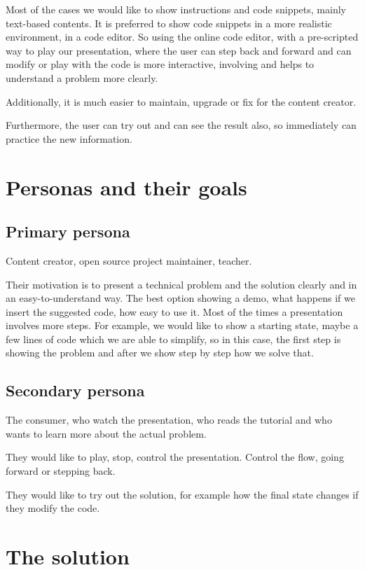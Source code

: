 \documentclass[11pt, a4paper, twoside, openright]{report}
\begin{document}
Most of the cases we would like to show instructions and code snippets, mainly text-based contents. It is preferred to show code snippets in a more realistic environment, in a code editor. So using the online code editor, with a pre-scripted way to play our presentation, where the user can step back and forward and can modify or play with the code is more interactive, involving and helps to understand a problem more clearly.

Additionally, it is much easier to maintain, upgrade or fix for the content creator.

Furthermore, the user can try out and can see the result also, so immediately can practice the new information.

\section{Personas and their goals}

\subsection{Primary persona}

Content creator, open source project maintainer, teacher.

Their motivation is to present a technical problem and the solution clearly and in an easy-to-understand way. The best option showing a demo, what happens if we insert the suggested code, how easy to use it. Most of the times a presentation involves more steps. For example, we would like to show a starting state, maybe a few lines of code which we are able to simplify, so in this case, the first step is showing the problem and after we show step by step how we solve that.

\subsection{Secondary persona}

The consumer, who watch the presentation, who reads the tutorial and who wants to learn more about the actual problem.

They would like to play, stop, control the presentation. Control the flow, going forward or stepping back.

They would like to try out the solution, for example how the final state changes if they modify the code.

\section{The solution}
\end{document}
